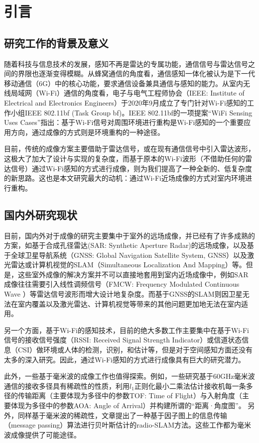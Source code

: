 \section{引言}
\subsection{研究工作的背景及意义}
随着科技与信息技术的发展，感知不再是雷达的专属功能，通信信号与雷达信号之间的界限也逐渐变得模糊。从蜂窝通信的角度看，通信感知一体化被认为是下一代移动通信（6G）中的核心功能，要求通信设备兼具通信与感知的能力\cite{ISAC}。从室内无线局域网（Wi-Fi）通信的角度看，电子与电气工程师协会（IEEE: Institute of Electrical and Electronics Engineers）于2020年9月成立了专门针对Wi-Fi感知的工作小组IEEE 802.11bf (Task Group bf)\cite{TGbf_PAR}。IEEE 802.11bf的一项提案``WiFi Sensing Uses Cases''\cite{TGbf_Use_Case}指出：基于Wi-Fi信号对周围环境进行重构是Wi-Fi感知的一个重要应用方向，通过成像的方式则是环境重构的一种途径。


目前，传统的成像方案主要借助于雷达信号，或在现有通信信号中引入雷达波形，这极大了加大了设计与实现的复杂度，而基于原本的Wi-Fi波形（不借助任何的雷达信号）通过Wi-Fi感知的方式进行成像，则为我们提高了一种全新的、低复杂度的新思路。这也是本文研究最大的动机：通过Wi-Fi近场成像的方式对室内环境进行重构。
\subsection{国内外研究现状}
目前，国内外对于成像的研究主要集中于室外的远场成像，并已经有了许多成熟的方案，如基于合成孔径雷达(SAR: Synthetic Aperture Radar)的远场成像\cite{indoorSAR}，以及基于全球卫星导航系统（GNSS: Global Navigation Satellite System, GNSS）以及激光雷达或计算机视觉的SLAM（Simultaneous Localization And Mapping）等\cite{NavigationSAR}。但是，这些室外成像的解决方案并不可以直接地套用到室内近场成像中，例如SAR成像往往需要引入线性调频信号（FMCW: Frequency Modulated Continuous Wave ）等雷达信号波形而增大设计地复杂度。而基于GNSS的SLAM则因卫星无法在室内覆盖以及激光雷达、计算机视觉等带来的其他问题更加地无法在室内适用。


另一个方面，基于Wi-Fi的感知技术，目前的绝大多数工作主要集中在基于Wi-Fi信号的接收信号强度（RSSI: Received Signal Strength Indicator）或信道状态信息（CSI）做环境或人体的检测，识别，和估计等\cite{ma2019wifi}，但是对于空间感知方面还没有太多的深入研究。因此，通过Wi-Fi感知的方式进行成像具有巨大的研究潜力。

此外，一些基于毫米波的成像工作也值得探索。例如，一些研究基于60GHz毫米波通信的接收多径具有稀疏性的性质，利用$l_1$正则化最小二乘法估计接收机每一条多径的传输距离（主要体现为多径中的参数TOF: Time of Flight）与入射角度（主要体现为多径中的参数AOA: Angle of Arrival）并构建所谓的``距离·角度图''。
另外，同样基于毫米波的稀疏性，文章\cite{yang2022hybrid}提出了一种基于因子图上的信息传输（message passing）算法进行贝叶斯估计的radio-SLAM方法。这些工作都为毫米波成像提供了可能途径\cite{barneto2021millimeter}。

